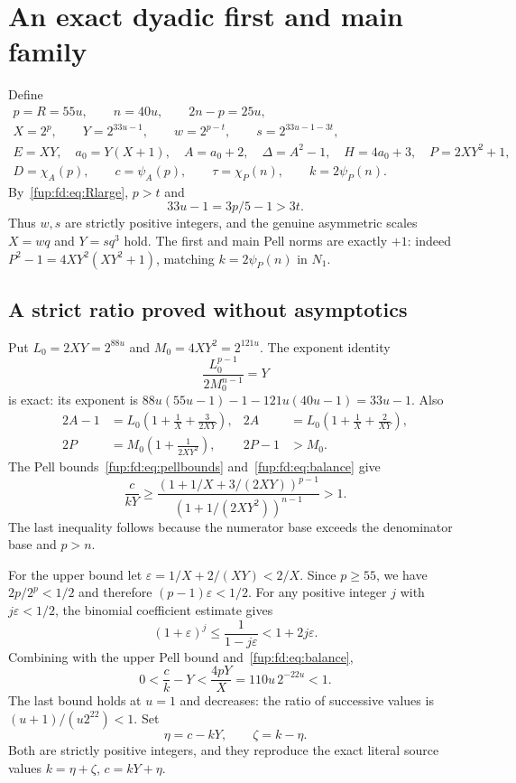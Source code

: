 \documentclass[11pt,letterpaper]{article}
\theoremstyle{definition}\newtheorem{definition}[theorem]{Definition}
\theoremstyle{remark}\newtheorem{remark}[theorem]{Remark}
\begin{document}
\section{An exact dyadic first and main family}\label{fup:fd:sec:dyadic}
Define
\begin{equation}\label{fup:fd:eq:dyadic}
 \begin{gathered}
 p=R=55u,\qquad n=40u,\qquad 2n-p=25u,\\
 X=2^p,\qquad Y=2^{33u-1},\qquad
 w=2^{p-t},\qquad s=2^{33u-1-3t},\\
 E=XY,\quad a_0=Y(X+1),\quad A=a_0+2,\quad
 \Delta=A^2-1,\quad H=4a_0+3,\quad P=2XY^2+1,\\
 D=\chi_A(p),\qquad c=\psi_A(p),\qquad
 \tau=\chi_P(n),\qquad k=2\psi_P(n).
 \end{gathered}
\end{equation}
By~\eqref{fup:fd:eq:Rlarge}, $p>t$ and
\[
 33u-1=3p/5-1>3t.
\]
Thus $w,s$ are strictly positive integers, and the genuine asymmetric scales $X=wq$ and $Y=sq^3$ hold. The first and main Pell norms are exactly $+1$: indeed $P^2-1=4XY^2(XY^2+1)$, matching $k=2\psi_P(n)$ in $N_1$.

\subsection{A strict ratio proved without asymptotics}
Put $L_0=2XY=2^{88u}$ and $M_0=4XY^2=2^{121u}$. The exponent identity
\begin{equation}\label{fup:fd:eq:balance}
 \frac{L_0^{p-1}}{2M_0^{n-1}}=Y
\end{equation}
is exact: its exponent is $88u(55u-1)-1-121u(40u-1)=33u-1$. Also
\begin{align*}
 2A-1&=L_0\left(1+\frac1X+\frac{3}{2XY}\right),&
 2A&=L_0\left(1+\frac1X+\frac2{XY}\right),\\
 2P&=M_0\left(1+\frac1{2XY^2}\right),&2P-1&>M_0.
\end{align*}
The Pell bounds~\eqref{fup:fd:eq:pellbounds} and~\eqref{fup:fd:eq:balance} give
\[
 \frac{c}{kY}\ge
 \frac{(1+1/X+3/(2XY))^{p-1}}
 {(1+1/(2XY^2))^{n-1}}>1.
\]
The last inequality follows because the numerator base exceeds the denominator base and $p>n$.

For the upper bound let $\varepsilon=1/X+2/(XY)<2/X$. Since $p\ge55$, we have $2p/2^p<1/2$ and therefore $(p-1)\varepsilon<1/2$. For any positive integer $j$ with $j\varepsilon<1/2$, the binomial coefficient estimate gives
\[
 (1+\varepsilon)^j\le\frac1{1-j\varepsilon}
 <1+2j\varepsilon.
\]
Combining with the upper Pell bound and~\eqref{fup:fd:eq:balance},
\begin{equation}\label{fup:fd:eq:ratio}
 0<\frac ck-Y<\frac{4pY}{X}
 =110u\,2^{-22u}<1.
\end{equation}
The last bound holds at $u=1$ and decreases: the ratio of successive values is $(u+1)/(u2^{22})<1$. Set
\begin{equation}\label{fup:fd:eq:slacks}
 \eta=c-kY,\qquad\zeta=k-\eta.
\end{equation}
Both are strictly positive integers, and they reproduce the exact literal source values $k=\eta+\zeta$, $c=kY+\eta$.
\end{document}
